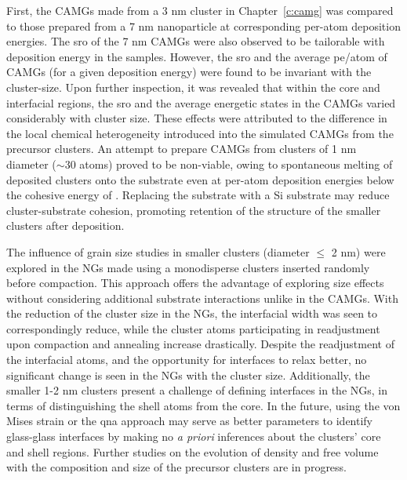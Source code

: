 First, the CAMGs made from a 3 nm cluster in Chapter~\ref{c:camg} was compared to those prepared from a 7 nm nanoparticle at corresponding per-atom deposition energies. The \gls{sro} of the 7 nm CAMGs were also observed to be tailorable with deposition energy in the samples. However, the \gls{sro} and the average \gls{pe}/atom of CAMGs (for a given deposition energy) were found to be invariant with the cluster-size. Upon further inspection, it was revealed that within the core and interfacial regions, the \gls{sro} and the average energetic states in the CAMGs varied considerably with cluster size. These effects were attributed to the difference in the local chemical heterogeneity introduced into the simulated CAMGs from the precursor clusters. An attempt to prepare CAMGs from clusters of 1 nm diameter ($\sim$30 atoms) proved to be non-viable, owing to spontaneous melting of deposited clusters onto the substrate even at per-atom deposition energies below the cohesive energy of \cz . Replacing the \cz substrate with a Si substrate may reduce cluster-substrate cohesion, promoting retention of the structure of the smaller clusters after deposition. \par

The influence of grain size studies in smaller clusters (diameter $\leq$ 2 nm) were explored in the \cz NGs made using a monodisperse clusters inserted randomly before compaction. This approach offers the advantage of exploring size effects without considering additional substrate interactions unlike in the CAMGs. With the reduction of the cluster size in the NGs, the interfacial width was seen to correspondingly reduce, while the cluster atoms participating in readjustment upon compaction and annealing increase drastically. Despite the readjustment of the interfacial atoms, and the opportunity for interfaces to relax better, no significant change is seen in the NGs with the cluster size. Additionally, the smaller 1-2 nm clusters present a challenge of defining interfaces in the NGs, in terms of distinguishing the shell atoms from the core. In the future, using the von Mises strain or the \gls{qna} approach \cite{Feng2020} may serve as better parameters to identify glass-glass interfaces by making no \textit{a priori} inferences about the clusters' core and shell regions. Further studies on the evolution of density and free volume with the composition and size of the precursor clusters are in progress. \par
